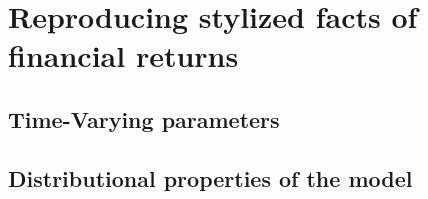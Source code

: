 \newpage

\section{Reproducing stylized facts of financial returns}

\subsection{Time-Varying parameters}

 \subsection{Distributional properties of the model}
 